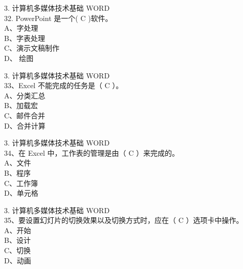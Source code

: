 \documentclass[aspectratio=169]{beamer}
\begin{document}
\begin{frame}[t]{3. 计算机多媒体技术基础} \vspace{20pt}
    WORD\\

32. PowerPoint 是一个( C )软件。\\
A、字处理\\ B、字表处理\\ C、演示文稿制作\\ D、 绘图\\

\end{frame}

\begin{frame}[t]{3. 计算机多媒体技术基础} \vspace{20pt}
    WORD\\
33、Excel 不能完成的任务是（ C ）。\\
A、分类汇总\\ B、加载宏\\C、邮件合并\\ D、合并计算\\

\end{frame}


\begin{frame}[t]{3. 计算机多媒体技术基础} \vspace{20pt}
    WORD\\

34、在 Excel 中，工作表的管理是由（ C ）来完成的。\\
A、文件\\ B、程序\\ C、工作簿\\ D、单元格\\

\end{frame}



\begin{frame}[t]{3. 计算机多媒体技术基础} \vspace{20pt}
    WORD\\
35、要设置幻灯片的切换效果以及切换方式时，应在（ C ）选项卡中操作。\\
A、开始\\ B、设计\\ C、切换\\ D、动画\\

\end{frame}
\end{document}
